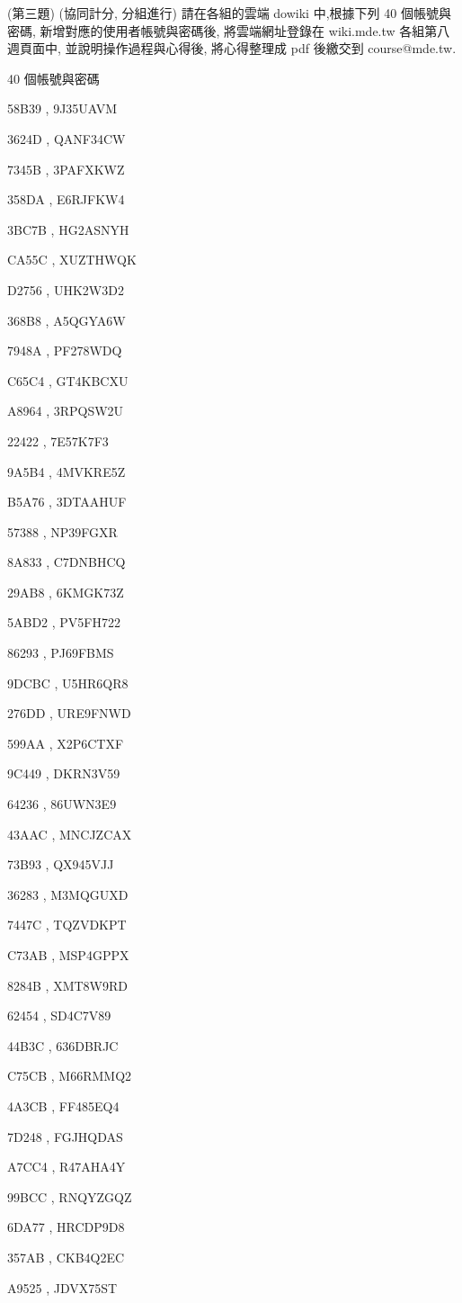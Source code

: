 \documentclass[]{article}
\begin{document}
(第三題) (協同計分, 分組進行) 請在各組的雲端 dowiki 中,根據下列 40
個帳號與密碼, 新增對應的使用者帳號與密碼後, 將雲端網址登錄在 wiki.mde.tw
各組第八週頁面中, 並說明操作過程與心得後, 將心得整理成 pdf 後繳交到
course@mde.tw.

40 個帳號與密碼

58B39 , 9J35UAVM

3624D , QANF34CW

7345B , 3PAFXKWZ

358DA , E6RJFKW4

3BC7B , HG2ASNYH

CA55C , XUZTHWQK

D2756 , UHK2W3D2

368B8 , A5QGYA6W

7948A , PF278WDQ

C65C4 , GT4KBCXU

A8964 , 3RPQSW2U

22422 , 7E57K7F3

9A5B4 , 4MVKRE5Z

B5A76 , 3DTAAHUF

57388 , NP39FGXR

8A833 , C7DNBHCQ

29AB8 , 6KMGK73Z

5ABD2 , PV5FH722

86293 , PJ69FBMS

9DCBC , U5HR6QR8

276DD , URE9FNWD

599AA , X2P6CTXF

9C449 , DKRN3V59

64236 , 86UWN3E9

43AAC , MNCJZCAX

73B93 , QX945VJJ

36283 , M3MQGUXD

7447C , TQZVDKPT

C73AB , MSP4GPPX

8284B , XMT8W9RD

62454 , SD4C7V89

44B3C , 636DBRJC

C75CB , M66RMMQ2

4A3CB , FF485EQ4

7D248 , FGJHQDAS

A7CC4 , R47AHA4Y

99BCC , RNQYZGQZ

6DA77 , HRCDP9D8

357AB , CKB4Q2EC

A9525 , JDVX75ST
\end{document}
